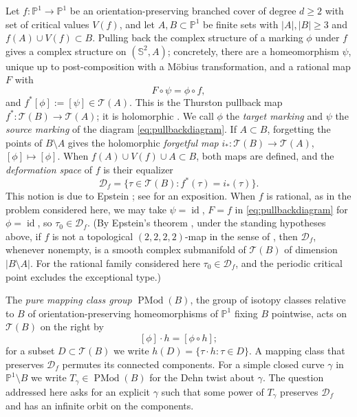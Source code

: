 \documentclass[12pt]{article}
\newcommand{\Pone}{\mathbb P^1}
\newcommand{\Sph}{\mathbb S^2}
\newcommand{\Teich}{\mathcal T}
\newcommand{\D}{\mathcal D}
\newcommand{\id}{\operatorname{id}}
\newcommand{\PMod}{\operatorname{PMod}}
\theoremstyle{remark}
\numberwithin{equation}{section}
\begin{document}
Let $f\colon\Pone\to\Pone$ be an orientation-preserving branched cover of
degree $d\ge2$ with set of critical values $V(f)$, and let $A,B\subset\Pone$
be finite sets with $|A|,|B|\ge3$ and $f(A)\cup V(f)\subset B$.
Pulling back the complex structure of a marking $\phi$ under $f$ gives a
complex structure on $(\Sph,A)$; concretely, there are a homeomorphism
$\psi$, unique up to post-composition with a M\"obius transformation, and a
rational map $F$ with
\begin{equation}\label{eq:pullbackdiagram}
 F\circ\psi=\phi\circ f ,
\end{equation}
and $f^*[\phi]:=[\psi]\in\Teich(A)$. This is the Thurston pullback map
$f^*\colon\Teich(B)\to\Teich(A)$; it is holomorphic
\cite[\S1.3, Prop.\ 1.4]{BCT}. We call $\phi$ the \emph{target marking} and
$\psi$ the \emph{source marking} of the diagram
\eqref{eq:pullbackdiagram}. If $A\subset B$, forgetting the points of
$B\setminus A$ gives the holomorphic \emph{forgetful map}
$i_*\colon\Teich(B)\to\Teich(A)$, $[\phi]\mapsto[\phi]$. When
$f(A)\cup V(f)\cup A\subset B$, both maps are defined, and the
\emph{deformation space} of $f$ is their equalizer
\[
 \D_f=\{\tau\in\Teich(B):f^*(\tau)=i_*(\tau)\}.
\]
This notion is due to Epstein \cite{Ep}; see \cite[\S1.4]{BCT} for an
exposition. When $f$ is rational, as in the problem considered here, we
may take $\psi=\id$, $F=f$ in \eqref{eq:pullbackdiagram} for $\phi=\id$,
so $\tau_0\in\D_f$. (By Epstein's theorem \cite[Thm.\ 1.5]{BCT}, under the
standing hypotheses above, if $f$ is not a topological $(2,2,2,2)$-map in
the sense of \cite[\S1.4]{BCT}, then $\D_f$, whenever nonempty, is a smooth
complex submanifold of $\Teich(B)$ of dimension $|B\setminus A|$. For the
rational family considered here $\tau_0\in\D_f$, and the periodic critical
point excludes the exceptional type.)

The \emph{pure mapping class group} $\PMod(B)$, the group of isotopy classes
relative to $B$ of orientation-preserving homeomorphisms of $\Pone$ fixing
$B$ pointwise, acts on $\Teich(B)$ on the right by
\begin{equation}\label{eq:rightaction}
 [\phi]\cdot h=[\phi\circ h];
\end{equation}
for a subset $D\subset\Teich(B)$ we write $h(D)=\{\tau\cdot h:\tau\in D\}$.
A mapping class that preserves $\D_f$ permutes its connected components.
For a simple closed curve $\gamma$ in $\Pone\setminus B$ we write
$T_\gamma\in\PMod(B)$ for the Dehn twist about $\gamma$. The question
addressed here asks for an explicit $\gamma$ such that some power of
$T_\gamma$ preserves $\D_f$ and has an infinite orbit on the components.
\end{document}
